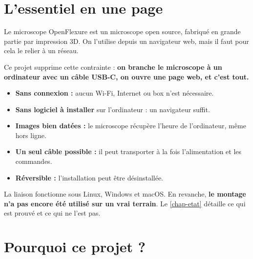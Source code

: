 \documentclass[11pt,a4paper,openany]{report}
\begin{document}
\chapter*{L'essentiel en une page}

\begin{synthese}[En bref]
Le microscope OpenFlexure est un microscope open source, fabriqué en grande partie par impression 3D. On l'utilise depuis un navigateur web, mais il faut pour cela le relier à un réseau.

Ce projet supprime cette contrainte : \textbf{on branche le microscope à un ordinateur avec un câble USB-C, on ouvre une page web, et c'est tout.}
\end{synthese}

\begin{itemize}
  \item \textbf{Sans connexion :} aucun Wi-Fi, Internet ou box n'est nécessaire.
  \item \textbf{Sans logiciel à installer} sur l'ordinateur : un navigateur suffit.
  \item \textbf{Images bien datées :} le microscope récupère l'heure de l'ordinateur, même hors ligne.
  \item \textbf{Un seul câble possible :} il peut transporter à la fois l'alimentation et les commandes.
  \item \textbf{Réversible :} l'installation peut être désinstallée.
\end{itemize}

\begin{attention}
La liaison fonctionne sous Linux, Windows et macOS. En revanche, \textbf{le montage n'a pas encore été utilisé sur un vrai terrain}. Le \cref{chap-etat} détaille ce qui est prouvé et ce qui ne l'est pas.
\end{attention}

\tableofcontents
\cleardoublepage
{}

\chapter{Pourquoi ce projet ?}
\end{document}
